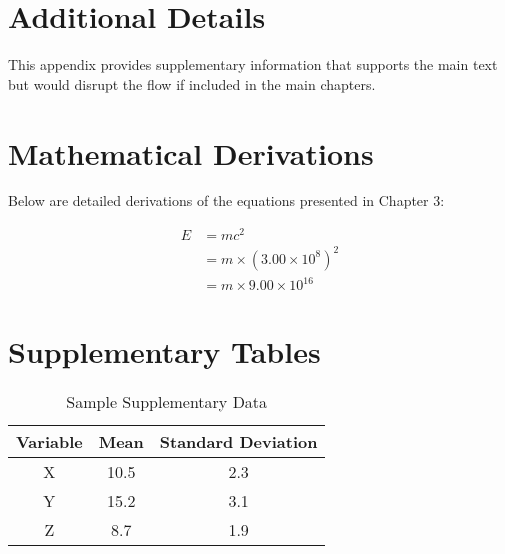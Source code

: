 \section{Additional Details}

This appendix provides supplementary information that supports the main text but would disrupt the flow if included in the main chapters.

\section{Mathematical Derivations}

Below are detailed derivations of the equations presented in Chapter 3:

$$
\begin{aligned}
E &= mc^2 \\
&= m \times (3.00 \times 10^8)^2 \\
&= m \times 9.00 \times 10^{16}
\end{aligned}
$$

\section{Supplementary Tables}

\begin{table}[h]
\centering
\caption{Sample Supplementary Data}
\begin{tabular}{|c|c|c|}
\hline
Variable & Mean & Standard Deviation \\
\hline
X & 10.5 & 2.3 \\
Y & 15.2 & 3.1 \\
Z & 8.7 & 1.9 \\
\hline
\end{tabular}
\end{table}
